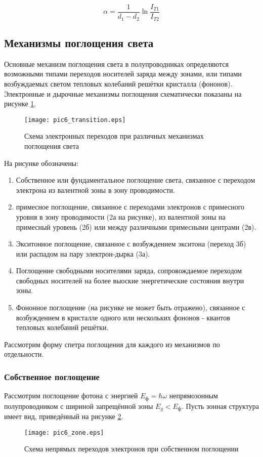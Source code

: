 \begin{equation}
\alpha = \frac{1}{d_{1}-d_{2}} \ln \frac{I_{T1}}{I_{T2}}
\end{equation}

\subsection{Механизмы поглощения света}
Основные механизм поглощения света в полупроводниках определяются возможными типами переходов носителей заряда между зонами, или типами возбуждаемых светом тепловых колебаний решётки кристалла (фононов). Электронные и дырочные механизмы поглощения схематически показаны на рисунке \ref{pic6_transition}.

\begin{figure}[h!]\centering
\texttt{[image: pic6\_transition.eps]}
\caption{Схема электронных переходов при различных механизмах поглощения света}
\label{pic6_transition}
\end{figure}

На рисунке обозначены:

\begin{enumerate}
\item Собственное или фундаментальное поглощение света, связанное с переходом электрона из валентной зоны в зону проводимости.
\item примесное поглощение, связанное с переходами электронов с примесного уровня в зону проводимости (2а на рисунке), из валентной зоны на примесный уровень (2б) или между различными примесными центрами (2в).
\item Экситонное поглощение, связанное с возбуждением экситона (переход 3б) или распадом на пару электрон-дырка (3а).
\item Поглощение свободными носителями заряда, сопровождаемое переходом свободных носителей на более выоские энергетические состояния внутри зоны.
\item Фононное поглощение (на рисунке не может быть отражено), связанное с возбуждением в кристалле одного или нескольких фононов - квантов тепловых колебаний решётки.
\end{enumerate}

Рассмотрим форму спетра поглощения для каждого из механизмов по отдельности.

\subsubsection{Собственное поглощение}
Рассмотрим поглощение фотона с энергией $E_{\text{ф}} = \hbar \omega$ непрямозонным полупроводником с шириной запрещённой зоны $E_{g} < E_{\text{ф}}$. Пусть зонная структура имеет вид, приведённый на рисунке \ref{pic6_zone}.

\begin{figure}[h!]\centering
\texttt{[image: pic6\_zone.eps]}
\caption{Схема непрямых переходов электронов при собственном поглощении}
\label{pic6_zone}
\end{figure}

